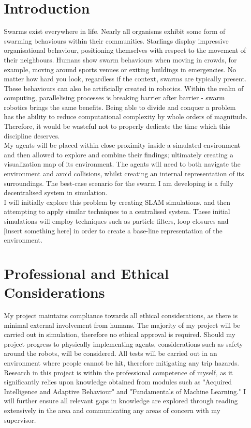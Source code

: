 \documentclass[12pt]{article}
\begin{document}
\section{Introduction}
Swarms exist everywhere in life. Nearly all organisms exhibit some form of swarming behaviours within their
communities. Starlings display impressive organisational behaviour, positioning themselves with respect to the
movement of their neighbours. Humans show swarm behaviours when moving in crowds, for example, moving around sports
venues or exiting buildings in emergencies. No matter how hard you look, regardless if the context, swarms are
typically present.\\
These behaviours can also be artificially created in robotics. Within the realm of computing, parallelising
processes is breaking barrier after barrier - swarm robotics brings the same benefits. Being able to divide and
conquer a problem has the ability to reduce computational complexity by whole orders of magnitude. Therefore, it
would be wasteful not to properly dedicate the time which this discipline deserves.\\
My agents will be placed within close proximity inside a simulated environment and then allowed to explore and
combine their findings; ultimately creating a visualization map of its environment. The agents will need to both
navigate the environment and avoid collisions, whilst creating an internal representation of its surroundings. The
best-case scenario for the swarm I am developing is a fully decentralised system in simulation.\\
I will initially explore this problem by creating SLAM simulations, and then attempting to apply similar techniques
to a centralised system. These initial simulations will employ techniques such as particle filters, loop closures
and [insert something here] in order to create a base-line representation of the environment.

\section{Professional and Ethical Considerations}
My project maintains compliance towards all ethical considerations, as there is minimal external involvement from
humans. The majority of my project will be carried out in simulation, therefore no ethical approval is required. Should
my project progress to physically implementing agents, considerations such as safety around the robots, will be considered.
All tests will be carried out in an environment where people cannot be hit, therefore mitigating any trip hazards.\\
Research in this project is within the professional competence of myself, as it significantly relies upon knowledge
obtained from modules such as "Acquired Intelligence and Adaptive Behaviour" and "Fundamentals of Machine Learning." I
will further ensure all relevant gaps in knowledge are explored through reading extensively in the area and communicating
any areas of concern with my supervisor.
\end{document}
